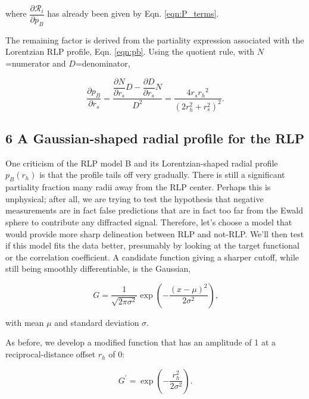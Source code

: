 \documentclass[12pt, letterpaper]{article}
\begin{document}
where  $\dfrac{\partial\mathscr{R}_i}{\partial p_B}$ has already been given by Eqn. \eqref{eqn:P_terms}. 

The remaining factor is derived from the partiality expression associated with the Lorentzian RLP 
profile, Eqn. \eqref{eqn:pb}.  Using the quotient rule, with $N$=numerator and $D$=denominator,

   \begin{equation}
    \frac{\partial p_B} {\partial r_s} = 
  \frac{
      \dfrac{\partial N}{\partial{r_s}} D-
      \dfrac{\partial D}{\partial{r_s}} N
    }
    {D^2}
    =
   \frac{4{r_s}{r_h}^2}{(2r_h^2 + r_s^2)^2}
    \text{.}
    \label{eqn:dpb_drs}
  \end{equation}

  \subsection*{6 A Gaussian-shaped radial profile for the RLP }
One criticism of the RLP model B and its Lorentzian-shaped radial profile $p_B (r_h)$ is that the
profile tails off very gradually.  There is still a significant partiality fraction many radii away from the
RLP center.  Perhaps this is unphysical; after all, we are trying to test the hypothesis that negative
measurements are in fact false predictions that are in fact too far from the Ewald sphere to contribute
any diffracted signal.  Therefore, let's choose a model that would provide more sharp delineation 
between RLP and not-RLP.  We'll then test if this model fits the data better, presumably by looking 
at the target functional or the correlation coefficient.
A candidate function giving a sharper cutoff, while still being smoothly
differentiable, is the Gaussian,

   \begin{equation}
    G = 
  \frac{1}{\sqrt{2\pi\sigma^2}}
   \exp (- \dfrac {(x - \mu)^2}{2\sigma^2})
    \text{,}
    \label{eqn:gaussian}
  \end{equation}

with mean $\mu$ and standard deviation $\sigma$.
  
As before, we develop a modified function that has an amplitude of 1 at a reciprocal-distance offset $r_h$ of 0:

   \begin{equation}
    G^{\prime} = 
   \exp (- \dfrac {r_h^2}{2\sigma^2})
    \text{.}
    \label{eqn:gaussprime}
  \end{equation}
\end{document}
